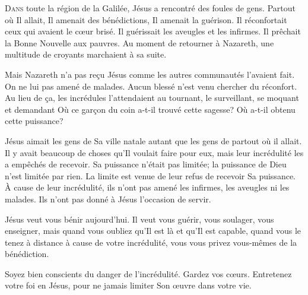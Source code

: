 \dvrule







\lettrine{D}{ans} toute la région de la Galilée,
 Jésus a rencontré des foules de gens. Partout où Il allait,
 Il amenait des bénédictions, Il amenait la guérison.
 Il réconfortait ceux qui avaient le c\oe{}ur brisé.
 Il guérissait les aveugles et les infirmes.
 Il prêchait la Bonne Nouvelle aux pauvres.
 Au moment de retourner à Nazareth, une multitude de croyants
 marchaient à sa suite.

Mais Nazareth n'a pas re\c{c}u Jésus comme les autres communautés
 l'avaient fait. On ne lui pas amené de malades.
 Aucun blessé n'est venu chercher du réconfort.
 Au lieu de \c{c}a, les incrédules l'attendaient au tournant,
 le surveillant, se moquant et demandant\frcolon{}
 \Og Où ce gar\c{c}on du coin a-t-il trouvé cette sagesse?
 Où a-t-il obtenu cette puissance? \Fg{}


Jésus aimait les gens de Sa ville natale autant que les gens
 de partout où il allait. Il y avait beaucoup de choses
 qu'Il voulait faire pour eux, mais leur incrédulité
 les a empêchés de recevoir. Sa puissance n'était pas limitée;
 la puissance de Dieu n'est limitée par rien.
 La limite est venue de leur refus de recevoir Sa puissance.
 À cause de leur incrédulité, ils n'ont pas amené les infirmes,
 les aveugles ni les malades. Ils n'ont pas donné à Jésus l'occasion de servir.

Jésus veut vous bénir aujourd'hui. Il veut vous guérir, vous soulager,
 vous enseigner, mais quand vous oubliez qu'Il est là et qu'Il est capable,
 quand vous le tenez à distance à cause de votre incrédulité,
 vous vous privez vous-mêmes de la bénédiction.

Soyez bien conscients du danger de l'incrédulité. Gardez vos c\oe{}urs.
 Entretenez votre foi en Jésus,
 pour ne jamais limiter Son \oe{}uvre dans votre vie.

